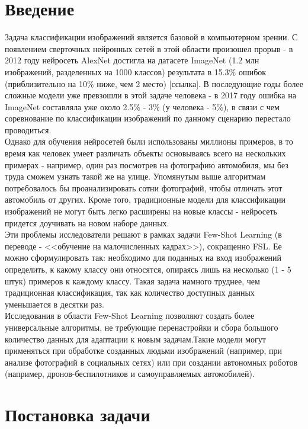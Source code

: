 \documentclass[a4paper, 12pt]{report}
\begin{document}
	\tableofcontents

\chapter{Введение}

Задача классификации изображений является базовой в компьютерном зрении. С появлением сверточных нейронных сетей в этой области произошел прорыв - в 2012 году нейросеть AlexNet достигла на датасете ImageNet (1.2 млн изображений, разделенных на 1000 классов) результата в 15.3\% ошибок (приблизительно на 10\% ниже, чем 2 место) [ссылка]. В последующие годы более сложные модели уже превзошли в этой задаче человека - в 2017 году ошибка на ImageNet составляла уже около 2.5\% - 3\% (у человека - 5\%), в связи с чем соревнование по классификации изображений по данному сценарию перестало проводиться. \\

Однако для обучения нейросетей были использованы миллионы примеров, в то время как человек умеет различать объекты основываясь всего на нескольких примерах - например, один раз посмотрев на фотографию автомобиля, мы без труда сможем узнать такой же на улице. Упомянутым выше алгоритмам потребовалось бы проанализировать сотни фотографий, чтобы отличать этот автомобиль от других. Кроме того, традиционные модели для классификации изображений не могут быть легко расширены на новые классы - нейросеть придется доучивать на новом наборе данных. \\

Эти проблемы исследователи решают в рамках задачи Few-Shot Learning (в переводе - <<обучение на малочисленных кадрах>>), сокращенно FSL. Ее можно сформулировать так: необходимо для поданных на вход изображений определить, к какому классу они относятся, опираясь лишь на несколько (1 - 5 штук) примеров к каждому классу. Такая задача намного труднее, чем традиционная классификация, так как количество доступных данных уменьшается в десятки раз. \\

Исследования в области Few-Shot Learning позволяют создать более универсальные алгоритмы, не требующие перенастройки и сбора большого количество данных для адаптации к новым задачам.Такие модели могут применяться при обработке созданных людьми изображений (например, при анализе фотографий в социальных сетях) или при создании автономных роботов (например, дронов-беспилотников и самоуправляемых автомобилей).

\chapter{Постановка задачи}
\end{document}
